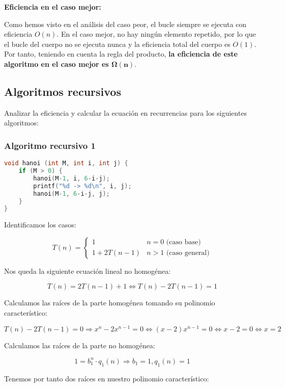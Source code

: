\textbf{Eficiencia en el caso mejor:}

Como hemos visto en el análisis del caso peor, el bucle  siempre se ejecuta con eficiencia $O(n)$.
En el caso mejor, no hay ningún elemento repetido, por lo que el bucle  del cuerpo no se ejecuta nunca y la eficiencia total del cuerpo es $O(1)$.
Por tanto, teniendo en cuenta la regla del producto, \textbf{la eficiencia de este algoritmo en el caso mejor es $\boldsymbol{\Omega(n)}$}.

\pagebreak

\subsection{Algoritmos recursivos}\label{eficiencia-recursivos}

Analizar la eficiencia y calcular la ecuación en recurrencias para los siguientes algoritmos:

\subsubsection{Algoritmo recursivo 1}

\begin{lstlisting}[language=C]
void hanoi (int M, int i, int j) {
	if (M > 0) {
		hanoi(M-1, i, 6-i-j);
		printf("%d -> %d\n", i, j);
		hanoi(M-1, 6-i-j, j);
	}
}
\end{lstlisting}

Identificamos los casos:

\[T(n)=
\begin{cases}
	1         & n=0\text{ (caso base)} \\
	1+2T(n-1) & n>1\text{ (caso general)}
\end{cases}
\]

Nos queda la siguiente ecuación lineal no homogénea:

\[T(n)=2T(n-1)+1\Leftrightarrow T(n)-2T(n-1)=1\]

Calculamos las raíces de la parte homogénea tomando su polinomio característico:

\[T(n)-2T(n-1)=0\Rightarrow x^n-2x^{n-1}=0\Leftrightarrow(x-2)x^{n-1}=0\Leftrightarrow x-2=0\Leftrightarrow x=2\]

Calculamos las raíces de la parte no homogénea:

\[1=b_1^n\cdot q_1(n)\Rightarrow b_1=1,q_1(n)=1\]

Tenemos por tanto dos raíces en nuestro polinomio característico:

